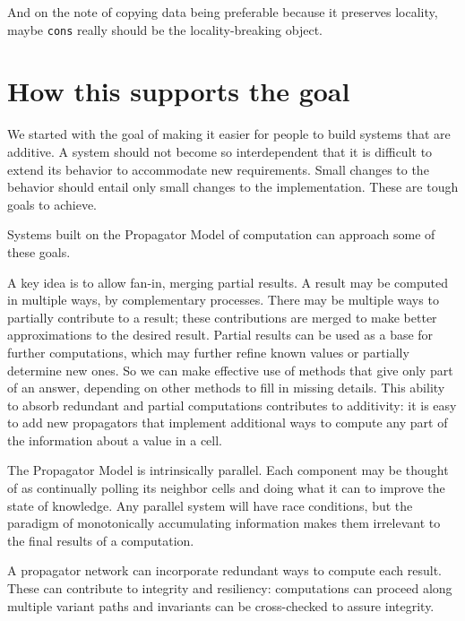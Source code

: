 \documentclass[12pt,letterpaper,english]{article}
\begin{document}
And on the note of copying data being preferable because it preserves
locality, maybe \texttt{cons} really should be the locality-breaking object.



\hypertarget{how-this-supports-the-goal}{}
\section{How this supports the goal}
\label{how-this-supports-the-goal}

We started with the goal of making it easier for people to build
systems that are additive.  A system should not become so
interdependent that it is difficult to extend its behavior to
accommodate new requirements.  Small changes to the behavior should
entail only small changes to the implementation.  These are tough
goals to achieve.

Systems built on the Propagator Model of computation can approach some
of these goals.

A key idea is to allow fan-in, merging partial results.  A result may
be computed in multiple ways, by complementary processes.  There may
be multiple ways to partially contribute to a result; these
contributions are merged to make better approximations to the desired
result.  Partial results can be used as a base for further
computations, which may further refine known values or partially
determine new ones.  So we can make effective use of methods that give
only part of an answer, depending on other methods to fill in missing
details.  This ability to absorb redundant and partial computations
contributes to additivity: it is easy to add new propagators that
implement additional ways to compute any part of the information about
a value in a cell.

The Propagator Model is intrinsically parallel.  Each component may be
thought of as continually polling its neighbor cells and doing what it
can to improve the state of knowledge.  Any parallel system will have
race conditions, but the paradigm of monotonically accumulating
information makes them irrelevant to the final results of a
computation.

A propagator network can incorporate redundant ways to compute each
result.  These can contribute to integrity and resiliency:
computations can proceed along multiple variant paths and invariants
can be cross-checked to assure integrity.
\end{document}
